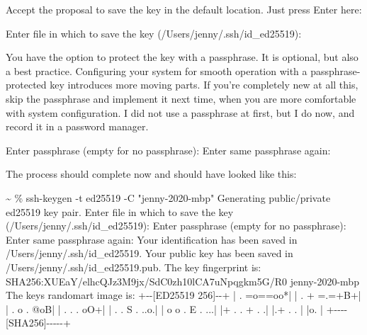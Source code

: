 \documentclass[
]{book}
\newenvironment{Shaded}{\begin{snugshade}}{\end{snugshade}}
\newcommand{\NormalTok}[1]{#1}
\begin{document}
Accept the proposal to save the key in the default location.
Just press Enter here:

\begin{Shaded}
\begin{Highlighting}[]
\NormalTok{Enter file in which to save the key (/Users/jenny/.ssh/id\_ed25519):}
\end{Highlighting}
\end{Shaded}

You have the option to protect the key with a passphrase.
It is optional, but also a best practice.
Configuring your system for smooth operation with a passphrase-protected key introduces more moving parts.
If you're completely new at all this, skip the passphrase and implement it next time, when you are more comfortable with system configuration.
I did not use a passphrase at first, but I do now, and record it in a password manager.

\begin{Shaded}
\begin{Highlighting}[]
\NormalTok{Enter passphrase (empty for no passphrase):}
\NormalTok{Enter same passphrase again: }
\end{Highlighting}
\end{Shaded}

The process should complete now and should have looked like this:

\begin{Shaded}
\begin{Highlighting}[]
\NormalTok{\textasciitilde{} \% ssh{-}keygen {-}t ed25519 {-}C "jenny{-}2020{-}mbp"        }
\NormalTok{Generating public/private ed25519 key pair.}
\NormalTok{Enter file in which to save the key (/Users/jenny/.ssh/id\_ed25519): }
\NormalTok{Enter passphrase (empty for no passphrase): }
\NormalTok{Enter same passphrase again: }
\NormalTok{Your identification has been saved in /Users/jenny/.ssh/id\_ed25519.}
\NormalTok{Your public key has been saved in /Users/jenny/.ssh/id\_ed25519.pub.}
\NormalTok{The key fingerprint is:}
\NormalTok{SHA256:XUEaY/elhcQJz3M9jx/SdC0zh10lCA7uNpqgkm5G/R0 jenny{-}2020{-}mbp}
\NormalTok{The key\textquotesingle{}s randomart image is:}
\NormalTok{+{-}{-}[ED25519 256]{-}{-}+}
\NormalTok{|        . =o==oo*|}
\NormalTok{|       . + =.=+B+|}
\NormalTok{|        . o . @oB|}
\NormalTok{|       . . .  oO+|}
\NormalTok{|  . .   S .  ..o.|}
\NormalTok{| o o . E .    ...|}
\NormalTok{|+ . . + .       .|}
\NormalTok{|.+   . .         |}
\NormalTok{|o.               |}
\NormalTok{+{-}{-}{-}{-}[SHA256]{-}{-}{-}{-}{-}+}
\end{Highlighting}
\end{Shaded}
\end{document}
